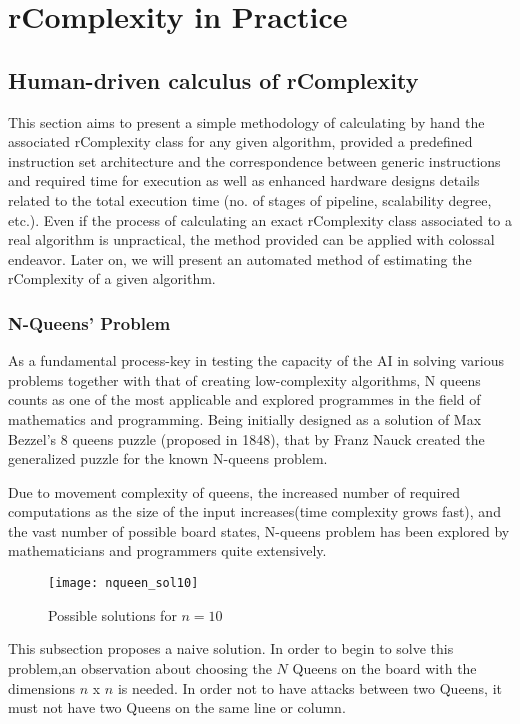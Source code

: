 \chapter{rComplexity in Practice}

\section{Human-driven calculus of rComplexity}
This section aims to present a simple methodology of calculating by hand the associated rComplexity class for any given algorithm, provided a predefined instruction set architecture and the correspondence between generic instructions and required time for execution as well as enhanced hardware designs details related to the total execution time (no. of stages of pipeline, scalability degree, etc.)\cite{hennessy2011computer}. Even if the process of calculating an exact rComplexity class associated to a real algorithm is unpractical, the method provided can be applied with colossal endeavor. Later on, we will present an automated method of estimating the rComplexity of a given algorithm.

\subsection{N-Queens’ Problem}


As a fundamental process-key in testing the capacity of the AI in solving various problems together with that of creating low-complexity algorithms, N queens counts as one of the most applicable and explored programmes in the field of mathematics and programming. Being initially designed as a solution of Max Bezzel’s 8 queens puzzle (proposed in 1848), that by Franz Nauck created the generalized puzzle for the known N-queens problem. 

Due to movement complexity of queens, the increased number of required computations as the size of the input increases(time complexity grows fast), and the vast number of possible board states, N-queens problem has been explored by mathematicians and programmers quite extensively.

\begin{figure}[H]
\centering
\texttt{[image: nqueen\_sol10]}
\caption{Possible solutions for $n=10$}
\end{figure}

This subsection proposes a naive solution. In order to begin to solve this problem,an observation about choosing the $N$ Queens on the board with the dimensions $n$ x $n$ is needed. In order not to have attacks between two Queens, it must not have two Queens on the same line or column. 



